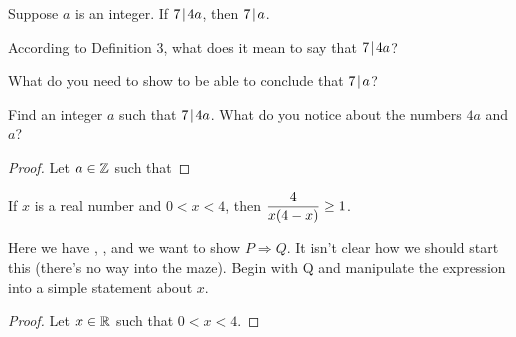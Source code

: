 \begin{claim}  Suppose $a$ is an integer.  If $7 \! \mid \! 4a$, then $7 \! \mid \! a$.\\
\end{claim}
\begin{mdframed}
	\begin{question}[resume]
	\item According to Definition 3, what does it mean to say that $7 \! \mid \! 4a$?
	\vspace{.75in}
	\item What do you need to show to be able to conclude that $7 \! \mid \! a$?
	\vspace{.75in}
	\item Find an integer $a$ such that $7 \! \mid \! 4a$.  What do you notice about the numbers $4a$ and $a$?
	\vspace{1in}
	\end{question}


\begin{proof} Let $a \in \mathbb{Z}$ such that

\vspace{4in}

\end{proof}
\end{mdframed}
\newpage
\begin{claim}  If $x$ is a real number and $0<x<4$, then $\displaystyle \frac{4}{x(4-x)} \geq 1$.
\end{claim}
\begin{mdframed}
\begin{question}[resume]
\item Here we have , , and we want to show $P \Rightarrow Q$.  It isn't clear how we should start this (there's no way into the maze).  Begin with Q and manipulate the expression into a simple statement about $x$.
\end{question}
	\vspace{4in}


\begin{proof}  Let $x \in \mathbb{R}$ such that $0<x<4$.

\vspace{2.6in}

\end{proof}
\end{mdframed}


